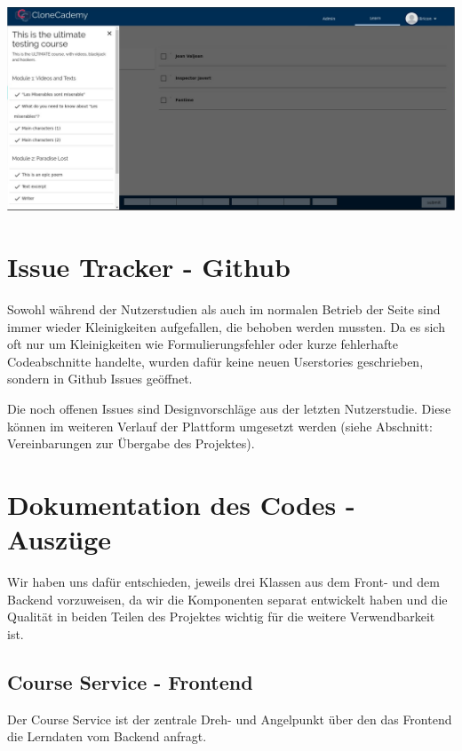 \documentclass[accentcolor=tud0b,12pt,paper=a4]{tudreport}
\begin{document}
	\includegraphics[height=0.3\textheight]{appendix/screenshots/question-0.jpeg}


\chapter{Issue Tracker - Github}
Sowohl während der Nutzerstudien als auch im normalen Betrieb der Seite sind immer wieder Kleinigkeiten aufgefallen, die behoben werden mussten. Da es sich oft nur um Kleinigkeiten wie Formulierungsfehler oder kurze fehlerhafte Codeabschnitte handelte, wurden dafür keine neuen Userstories geschrieben, sondern in Github Issues geöffnet. 

Die noch offenen Issues sind Designvorschläge aus der letzten Nutzerstudie. Diese können im weiteren Verlauf der Plattform umgesetzt werden (siehe Abschnitt: Vereinbarungen zur Übergabe des Projektes).

	
	
	


\chapter{Dokumentation des Codes - Auszüge}

	Wir haben uns dafür entschieden, jeweils drei Klassen aus dem Front- und dem Backend vorzuweisen, da wir die Komponenten separat entwickelt haben und die Qualität in beiden Teilen des Projektes wichtig für die weitere Verwendbarkeit ist.

	\section*{Course Service - Frontend}
	Der Course Service ist der zentrale Dreh- und Angelpunkt über den das Frontend die Lerndaten vom Backend anfragt.
\end{document}
